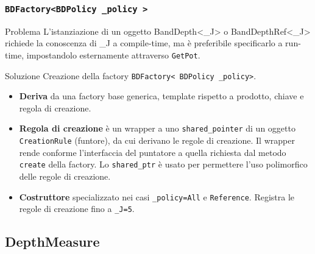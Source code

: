 \documentclass[9pt]{beamer}
\begin{document}
\begin{frame}
 \frametitle{\tt BDFactory<BDPolicy \_policy >}
\begin{alertblock}{Problema}
L’istanziazione di un oggetto BandDepth<\_J> o BandDepthRef<\_J> richiede la conoscenza di \_J a compile-time, ma \`e preferibile specificarlo a run-time,
impostandolo esternamente attraverso \texttt{GetPot}. 
\end{alertblock}
\begin{block}{Soluzione}
 Creazione della factory \texttt{BDFactory< BDPolicy \_policy>}.
\end{block}
\begin{itemize}
 \item \textbf{Deriva} da una factory base generica, template rispetto a prodotto, chiave e regola di creazione.
\item \textbf{Regola di creazione} \`e un wrapper a uno \texttt{shared\_pointer} di un oggetto \texttt{CreationRule} (funtore), da cui derivano le regole di creazione. Il wrapper 
		    rende conforme l'interfaccia del puntatore a quella richiesta dal metodo \texttt{create} della factory. Lo \texttt{shared\_ptr} \`e usato per permettere l'uso polimorfico
		    delle regole di creazione.
\item \textbf{Costruttore} specializzato nei casi \texttt{\_policy=All} e \texttt{Reference}. Registra le regole di creazione fino a \texttt{\_J=5}.
\end{itemize}

\end{frame}





\subsection{DepthMeasure}
\end{document}
